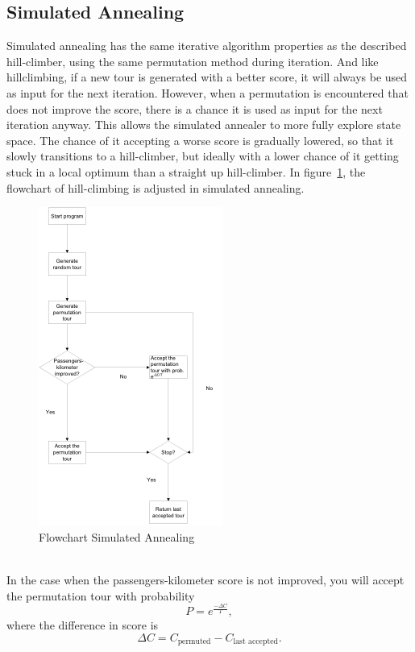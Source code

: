\documentclass[journal]{IEEEtran}
\begin{document}
\subsection{Simulated Annealing}
Simulated annealing has the same iterative algorithm properties as the described hill-climber, using the same permutation method during iteration. And like hillclimbing, if a new tour is generated with a better score, it will always be used as input for the next iteration. However, when a permutation is encountered that does not improve the score, there is a chance it is used as input for the next iteration anyway. This allows the simulated annealer to more fully explore state space. The chance of it accepting a worse score is gradually lowered, so that it slowly transitions to a hill-climber, but ideally with a lower chance of it getting stuck in a local optimum than a straight up hill-climber. In figure~\ref{fig:flowchart_sa}, the flowchart of hill-climbing is adjusted in simulated annealing.\\
\begin{figure}[!h]
\centering
\includegraphics{flowchart_sa}
\caption{Flowchart Simulated Annealing}
\label{fig:flowchart_sa}
\end{figure}
\\
In the case when the passengers-kilometer score is not improved, you will accept the permutation tour with probability 
\begin{equation}
P = e^{\frac{−\Delta C}{T}} ,
\end{equation}where the difference in score is 
\begin{equation}
\Delta C = C_{\text{permuted}} - C_{\text{last accepted}}.
\end{equation}
\end{document}

